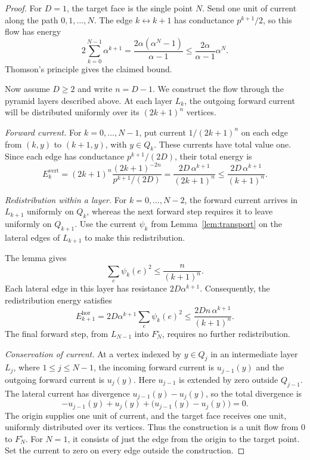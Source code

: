 \documentclass[conference]{IEEEtran}
\begin{document}
\begin{proof}
For $D=1$, the target face is the single point $N$.
Send one unit of current along the path $0,1,\dots,N$.
The edge $k\leftrightarrow k+1$ has conductance $p^{k+1}/2$,
so this flow has energy
\[
2\sum_{k=0}^{N-1}\alpha^{k+1}
=\frac{2\alpha(\alpha^N-1)}{\alpha-1}
\le \frac{2\alpha}{\alpha-1}\alpha^N.
\]
Thomson's principle gives the claimed bound.

Now assume $D\ge2$ and write $n=D-1$.
We construct the flow through the pyramid layers described above.
At each layer $L_k$, the outgoing forward current will be
distributed uniformly over its $(2k+1)^n$ vertices.

\emph{Forward current.}
For $k=0,\dots,N-1$, put current $1/(2k+1)^n$ on each edge
from $(k,y)$ to $(k+1,y)$, with $y\in Q_k$.
These currents have total value one. Since each edge has
conductance $p^{k+1}/(2D)$, their total energy is
\[
E_k^{\mathrm{vert}}
=(2k+1)^n
 \frac{(2k+1)^{-2n}}{p^{k+1}/(2D)}
=\frac{2D\,\alpha^{k+1}}{(2k+1)^n}
\le \frac{2D\,\alpha^{k+1}}{(k+1)^n}.
\]

\emph{Redistribution within a layer.}
For $k=0,\dots,N-2$, the forward current arrives in $L_{k+1}$
uniformly on $Q_k$, whereas the next forward step requires it
to leave uniformly on $Q_{k+1}$.
Use the current $\psi_k$ from Lemma~\ref{lem:transport}
on the lateral edges of $L_{k+1}$ to make this redistribution.

The lemma gives
\[
\sum_e\psi_k(e)^2\le \frac{n}{(k+1)^n}.
\]
Each lateral edge in this layer has resistance
$2D\alpha^{k+1}$. Consequently, the redistribution energy satisfies
\[
E_{k+1}^{\mathrm{hor}}
=2D\alpha^{k+1}\sum_e\psi_k(e)^2
\le \frac{2Dn\,\alpha^{k+1}}{(k+1)^n}.
\]
The final forward step, from $L_{N-1}$ into $F_N^\circ$,
requires no further redistribution.

\emph{Conservation of current.}
At a vertex indexed by $y\in Q_j$ in an intermediate layer
$L_j$, where $1\le j\le N-1$, the incoming forward current
is $u_{j-1}(y)$ and the outgoing forward current is $u_j(y)$.
Here $u_{j-1}$ is extended by zero outside $Q_{j-1}$.
The lateral current has divergence
$u_{j-1}(y)-u_j(y)$, so the total divergence is
\[
-u_{j-1}(y)+u_j(y)
+\bigl(u_{j-1}(y)-u_j(y)\bigr)=0.
\]
The origin supplies one unit of current, and the target face
receives one unit, uniformly distributed over its vertices.
Thus the construction is a unit flow from $0$ to $F_N^\circ$.
For $N=1$, it consists of just the edge from the origin to
the target point. Set the current to zero on every edge
outside the construction.


\end{proof}
\end{document}
